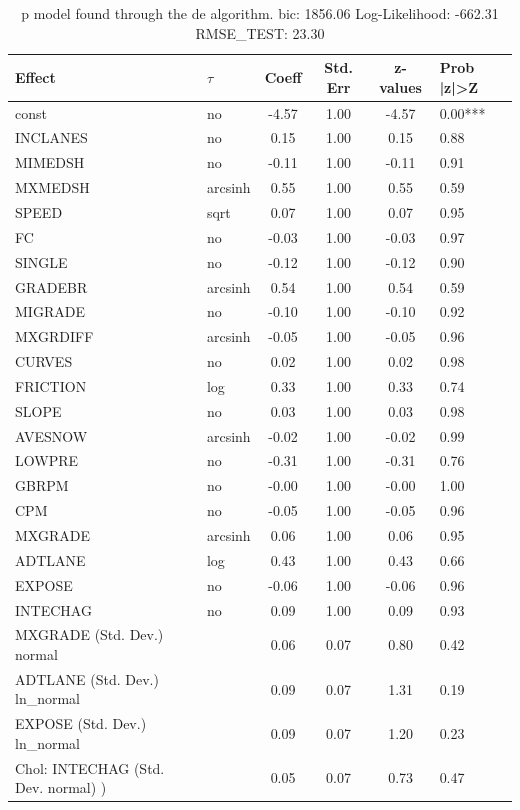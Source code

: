 \begin{table}
	\caption{p model found through the de algorithm. bic: 1856.06 Log-Likelihood: -662.31 RMSE_TEST: 23.30}
	\begin{center}
		\begin{tabular}{|l|l|c|c|c|l|}
			\hline
			Effect & $\tau$ & Coeff & Std. Err & z-values & Prob |z|>Z \\
			\hline
			const & no & -4.57 & 1.00 & -4.57 & 0.00*** \\
			\hline
			INCLANES & no & 0.15 & 1.00 & 0.15 & 0.88 \\
			\hline
			MIMEDSH & no & -0.11 & 1.00 & -0.11 & 0.91 \\
			\hline
			MXMEDSH & arcsinh & 0.55 & 1.00 & 0.55 & 0.59 \\
			\hline
			SPEED & sqrt & 0.07 & 1.00 & 0.07 & 0.95 \\
			\hline
			FC & no & -0.03 & 1.00 & -0.03 & 0.97 \\
			\hline
			SINGLE & no & -0.12 & 1.00 & -0.12 & 0.90 \\
			\hline
			GRADEBR & arcsinh & 0.54 & 1.00 & 0.54 & 0.59 \\
			\hline
			MIGRADE & no & -0.10 & 1.00 & -0.10 & 0.92 \\
			\hline
			MXGRDIFF & arcsinh & -0.05 & 1.00 & -0.05 & 0.96 \\
			\hline
			CURVES & no & 0.02 & 1.00 & 0.02 & 0.98 \\
			\hline
			FRICTION & log & 0.33 & 1.00 & 0.33 & 0.74 \\
			\hline
			SLOPE & no & 0.03 & 1.00 & 0.03 & 0.98 \\
			\hline
			AVESNOW & arcsinh & -0.02 & 1.00 & -0.02 & 0.99 \\
			\hline
			LOWPRE & no & -0.31 & 1.00 & -0.31 & 0.76 \\
			\hline
			GBRPM & no & -0.00 & 1.00 & -0.00 & 1.00 \\
			\hline
			CPM & no & -0.05 & 1.00 & -0.05 & 0.96 \\
			\hline
			MXGRADE & arcsinh & 0.06 & 1.00 & 0.06 & 0.95 \\
			\hline
			ADTLANE & log & 0.43 & 1.00 & 0.43 & 0.66 \\
			\hline
			EXPOSE & no & -0.06 & 1.00 & -0.06 & 0.96 \\
			\hline
			INTECHAG & no & 0.09 & 1.00 & 0.09 & 0.93 \\
			\hline
			MXGRADE (Std. Dev.) normal &  & 0.06 & 0.07 & 0.80 & 0.42 \\
			\hline
			ADTLANE (Std. Dev.) ln_normal &  & 0.09 & 0.07 & 1.31 & 0.19 \\
			\hline
			EXPOSE (Std. Dev.) ln_normal &  & 0.09 & 0.07 & 1.20 & 0.23 \\
			\hline
			 Chol: INTECHAG (Std. Dev. normal) ) &  & 0.05 & 0.07 & 0.73 & 0.47 \\
			\hline
		\end{tabular}
	\end{center}
\end{table}